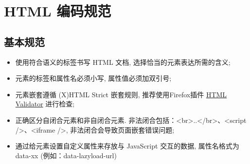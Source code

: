 \documentclass[letterpaper,10pt,english]{sphinxmanual}
\begin{document}
\section{HTML 编码规范}
\label{styleguide/html-coding-style:styleguide-htmlcodingstyle}\label{styleguide/html-coding-style:html}\label{styleguide/html-coding-style::doc}

\subsection{基本规范}
\label{styleguide/html-coding-style:id1}\begin{itemize}
\item {}
使用符合语义的标签书写 HTML 文档, 选择恰当的元素表达所需的含义;

\item {}
元素的标签和属性名必须小写, 属性值必须加双引号;

\item {}
元素嵌套遵循 (X)HTML Strict 嵌套规则, 推荐使用Firefox插件 \href{http://www.w3.org/TR/html4/}{HTML Validator} 进行检查;

\item {}
正确区分自闭合元素和非自闭合元素. 非法闭合包括：\textless{}br\textgreater{}..\textless{}/br\textgreater{}、\textless{}script /\textgreater{}、\textless{}iframe /\textgreater{}, 非法闭合会导致页面嵌套错误问题;

\item {}
通过给元素设置自定义属性来存放与 JavaScript 交互的数据, 属性名格式为 data-xx (例如：data-lazyload-url)

\end{itemize}
\end{document}
